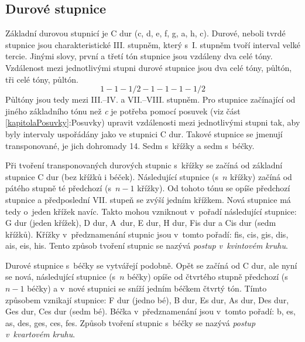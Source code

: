 \subsection{Durové stupnice}
Základní durovou stupnicí je C dur (c, d, e, f, g, a, h, c).
Durové, neboli tvrdé stupnice jsou charakteristické III. stupněm,
který s~I. stupněm tvoří interval velké tercie.
Jinými slovy, první a třetí tón stupnice jsou vzdáleny dva celé tóny.
Vzdálenost mezi jednotlivými stupni durové stupnice jsou dva celé tóny, 
půltón, tři celé tóny, půltón.
\begin{equation*}
    1 - 1 - 1/2 - 1 - 1 - 1 - 1/2
\end{equation*}
Půltóny jsou tedy mezi III.--IV. a VII.--VIII. stupněm.
Pro stupnice začínající od jiného základního tónu než \emph{c} 
je potřeba pomocí posuvek (viz část \ref{kapitolaPosuvky}:Posuvky) 
upravit vzdálenosti mezi jednotlivými stupni tak,
aby byly intervaly uspořádány jako ve stupnici C dur.
Takové stupnice  se jmenují transponované, je jich dohromady 14.
Sedm s~křížky a sedm s~béčky.
\cite{kofron}
\par

Při tvoření transponovaných durových stupnic s~křížky 
se začíná od základní stupnice C dur (bez křížků i béček).
Následující stupnice (s~$n$ křížky) začíná od pátého stupně té předchozí (s~$n-1$ křížky).
Od tohoto tónu se opíše předchozí stupnice 
a předposlední VII. stupeň se zvýší jedním křížkem.
Nová stupnice má tedy o~jeden křížek navíc.
Takto mohou vzniknout v~pořadí následující stupnice: 
G dur (jeden křížek), D dur, A~dur, E dur, H dur, Fis dur a Cis dur (sedm křížků).
Křížky v~předznamenání stupnic jsou v~tomto pořadí:
fis, cis, gis, dis, ais, eis, his.
Tento způsob tvoření stupnic se nazývá \emph{postup v~kvintovém kruhu}.
\cite{kofron}
\par

Durové stupnice s~béčky se vytvářejí podobně.
Opět se začíná od C dur, ale nyní se nová, 
následující stupnice (s~$n$ béčky) opíše od čtvrtého stupně předchozí (s~$n-1$ béčky)
a v~nové stupnici se sníží jedním béčkem čtvrtý tón.
Tímto způsobem vznikají stupnice:
F dur (jedno bé), B dur, Es dur, As dur, Des dur, Ges dur, Ces dur (sedm bé).
Béčka v~předznamenání jsou v~tomto pořadí:
b, es, as, des, ges, ces, fes.
Způsob tvoření stupnic s~béčky se nazývá \emph{postup v~kvartovém kruhu}.
\cite{kofron}
\par

